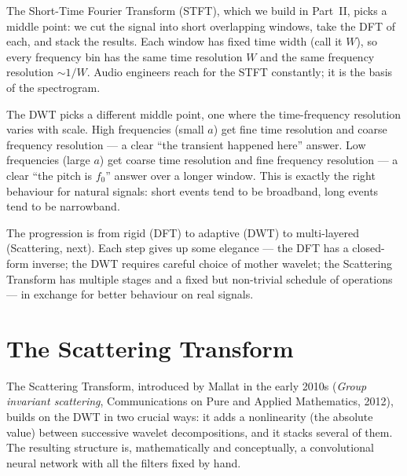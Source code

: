 The Short-Time Fourier Transform (STFT), which we build in Part~II,
picks a middle point: we cut the signal into short overlapping
windows, take the DFT of each, and stack the results.  Each window has
fixed time width (call it $W$), so every frequency bin has the same
time resolution $W$ and the same frequency resolution $\sim\!1/W$.
Audio engineers reach for the STFT constantly; it is the basis of the
spectrogram.

The DWT picks a different middle point, one where the time-frequency
resolution varies with scale.  High frequencies (small $a$) get fine
time resolution and coarse frequency resolution --- a clear ``the
transient happened here'' answer.  Low frequencies (large $a$) get
coarse time resolution and fine frequency resolution --- a clear
``the pitch is $f_0$'' answer over a longer window.  This is exactly
the right behaviour for natural signals: short events tend to be
broadband, long events tend to be narrowband.


The progression is from rigid (DFT) to adaptive (DWT) to multi-layered
(Scattering, next).  Each step gives up some elegance --- the DFT has a
closed-form inverse; the DWT requires careful choice of mother wavelet;
the Scattering Transform has multiple stages and a fixed but non-trivial
schedule of operations --- in exchange for better behaviour on real
signals.

\section{The Scattering Transform}
\label{sec:scattering}

The Scattering Transform, introduced by Mallat in the early 2010s
(\emph{Group invariant scattering}, Communications on Pure and Applied
Mathematics, 2012), builds on the DWT in two crucial ways: it adds a
nonlinearity (the absolute value) between successive wavelet
decompositions, and it stacks several of them.  The resulting structure
is, mathematically and conceptually, a convolutional neural network with
all the filters fixed by hand.

